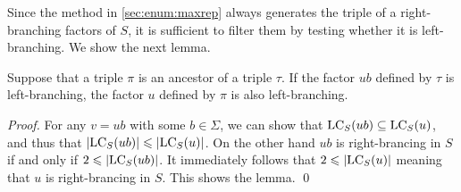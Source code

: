 

Since the method in \cref{sec:enum:maxrep} always generates the triple of a right-branching factors of $S$, it is sufficient to filter them by testing whether it is left-branching. We show the next lemma. 

\begin{lemmarep}\label{lem:prune:leftbranch}
Suppose that a triple $\pi$ is an ancestor of a triple $\tau$. If the factor $ub$ defined by $\tau$ is left-branching, the factor $u$ defined by $\pi$ is also left-branching. 
\end{lemmarep}

\begin{proof}
  For any $v = ub$ with some $b \in \Sigma$, we can show that
  $\mathrm{LC}_{S}(ub) \subseteq \mathrm{LC}_{S}(u)$, and thus that $|\mathrm{LC}_{S}(ub)| \leqslant |\mathrm{LC}_{S}(u)|$. On the other hand $ub$ is right-brancing in $S$ if and only if $2\leqslant |\mathrm{LC}_{S}(ub)|$. It immediately follows that $2 \leqslant |\mathrm{LC}_{S}(u)|$ meaning that $u$ is right-brancing in $S$. This shows the lemma. 
\qed\end{proof}

